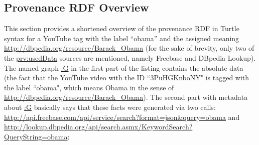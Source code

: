 \documentclass[conference]{IEEEtran}
\begin{document}
\subsection{Provenance RDF Overview}                                           \label{sec:appendix}
This section provides a shortened overview of the provenance RDF in Turtle syntax for a YouTube tag with the label ``obama'' and the assigned
meaning \url{http://dbpedia.org/resource/Barack_Obama} (for the sake of brevity, only two of the \url{prv:usedData}
sources are mentioned, namely Freebase and DBpedia Lookup). The named graph \url{:G} in the first part of the listing contains the absolute data (the fact that the YouTube video with the ID ``3PuHGKnboNY" is tagged with the label ``obama", which means Obama in the sense of \url{http://dbpedia.org/resource/Barack_Obama}). The second part with metadata about \url{:G} basically says that these facts were generated via two calls: \url{http://api.freebase.com/api/service/search?format=json&query=obama} and \url{http://lookup.dbpedia.org/api/search.asmx/KeywordSearch?QueryString=obama}:
\end{document}
